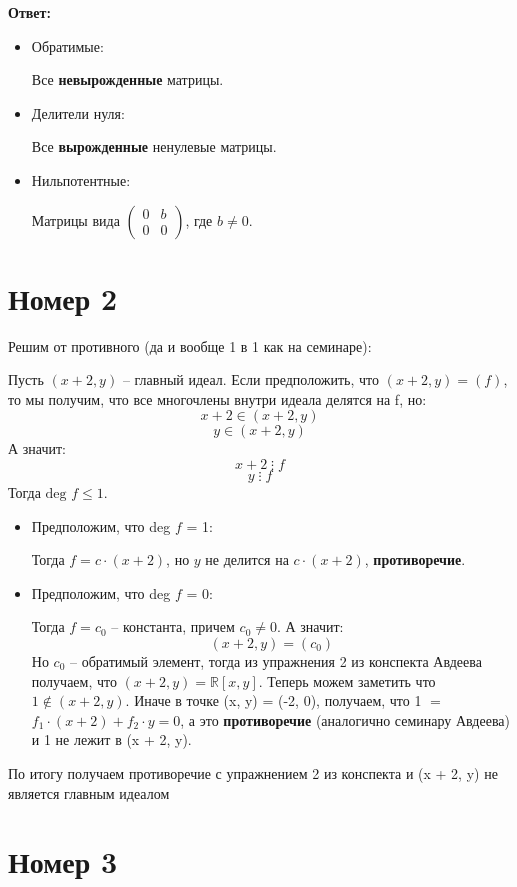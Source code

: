 \documentclass[a4paper,12pt]{article}
\begin{document}
\begin{center}
\textbf{Ответ: } 
\begin{itemize}
\item Обратимые:

Все \textbf{невырожденные} матрицы.

\item Делители нуля:

Все \textbf{вырожденные} ненулевые матрицы.

\item Нильпотентные:

Матрицы вида $\begin{pmatrix}
0 & b \\ 0 & 0
\end{pmatrix}$, где $b \neq 0$.
\end{itemize}
\end{center}

\section*{Номер 2}
Решим от противного (да и вообще 1 в 1 как на семинаре):

Пусть $(x + 2, y)$ -- главный идеал.  Если предположить, что $(x+ 2, y) = (f)$, то мы получим, что все многочлены внутри идеала делятся на f, но:
\[
x + 2 \in (x+2, y)
\]
\[
y \in (x + 2, y)
\]
А значит:
\[
x + 2\;  \vdots \; f
\]
\[
y \; \vdots \; f
\]
Тогда $\text{deg } f \leq 1$.
\begin{itemize}
\item Предположим, что deg $f$ = 1:

Тогда $f = c \cdot (x + 2)$, но $y$ не делится на $c \cdot (x + 2)$, \textbf{противоречие}.

\item Предположим, что deg $f$ = 0:

Тогда $ f = c_0 $ -- константа, причем $c_0 \neq 0$. А значит:
\[
(x + 2, y) = (c_0)
\]
Но $c_0$ -- обратимый элемент, тогда из упражнения 2 из конспекта Авдеева получаем, что $(x  + 2, y) = \mathbb{R}[x, y]$. Теперь можем заметить что $1 \notin (x + 2, y)$. Иначе в точке (x, y) = (-2, 0), получаем, что 1 $=$ $f_1 \cdot (x + 2) + f_2 \cdot y = 0$, а это \textbf{противоречие} (аналогично семинару Авдеева) и 1 не лежит в (x + 2, y). 
\end{itemize}
По итогу получаем противоречие с упражнением 2 из конспекта и (x + 2, y) не является главным идеалом


\clearpage
\section*{Номер 3}
\end{document}
